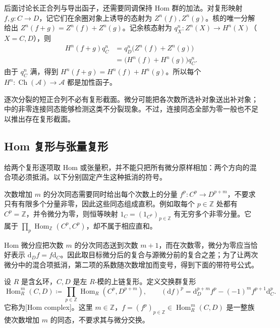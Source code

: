后面讨论长正合列与导出函子，还需要同调保持 Hom 群的加法。对复形映射 \(f,g:C\to D\)，记它们在余圈对象上诱导的态射为 \(Z^n(f),Z^n(g)\)。核的唯一分解给出 \(Z^n(f+g)=Z^n(f)+Z^n(g)\)。记余核态射为 \(q_X^n:Z^n(X)\to H^n(X)\)（\(X=C,D\)），则
\[
	\begin{aligned}
		H^n(f+g)q_C^n &=q_D^n\bigl(Z^n(f)+Z^n(g)\bigr)\\
		&=\bigl(H^n(f)+H^n(g)\bigr)q_C^n.
	\end{aligned}
\]
由于 \(q_C^n\) 满，得到 \(H^n(f+g)=H^n(f)+H^n(g)\)。所以每个 \(H^n:\operatorname{Ch}(\mathcal A)\to\mathcal A\) 都是加性函子。

\ProseParagraphBreak
逐次分裂的短正合列不必有复形截面。微分可能把各次数所选补对象送出补对象；中的非零连接同态能够检测这类不分裂现象。不过，连接同态全部为零一般也不足以推出存在复形截面。

\subsection{Hom 复形与张量复形}
\label{b4:subsec:0502:02}

给两个复形逐项取 Hom 或张量积，并不能只把所有微分原样相加：两个方向的混合项必须抵消。以下分别固定产生这种抵消的符号。

\ProseParagraphBreak
次数增加 \(m\) 的分次同态需要同时给出每个次数上的分量 \(f^p:C^p\to D^{p+m}\)，不要求只有有限多个分量非零，因此这些同态组成直积。例如取每个 \(p\in\mathbb Z\) 处都有 \(C^p=\mathbb Z\)，并令微分为零，则恒等映射 \(1_C=(1_{C^p})_{p\in\mathbb Z}\) 有无穷多个非零分量。它属于 \(\prod_p\operatorname{Hom}_{\mathbb Z}(C^p,C^p)\)，却不属于相应直和。

\ProseParagraphBreak
Hom 微分应把次数 \(m\) 的分次同态送到次数 \(m+1\)，而在次数零，微分为零应当恰好表示 \(\mathrm{d}_Df=f\mathrm{d}_C\)。因此取目标微分后的复合与源微分前的复合之差；为了让两次微分中的混合项抵消，第二项的系数随次数增加而变号，得到下面的带符号公式。

\begin{definition}\label{b4:def:hom-complex}
	设 \(R\) 是含幺环，\(C,D\) 是左 \(R\)-模的上链复形。定义交换群复形
	\[
		\operatorname{Hom}_R^m(C,D)\coloneqq \prod_{p\in\mathbb Z}\operatorname{Hom}_R(C^p,D^{p+m}), \qquad (\mathrm{d}f)^p=\mathrm{d}_D^{p+m}f^p-(-1)^m f^{p+1}\mathrm{d}_C^p.
	\]
	它称为[Hom complex]。这里 \(m\in\mathbb Z\)，\(f=(f^p)_{p\in\mathbb Z}\in\operatorname{Hom}_R^m(C,D)\) 是一整族使次数增加 \(m\) 的同态，不要求其与微分交换。
\end{definition}

